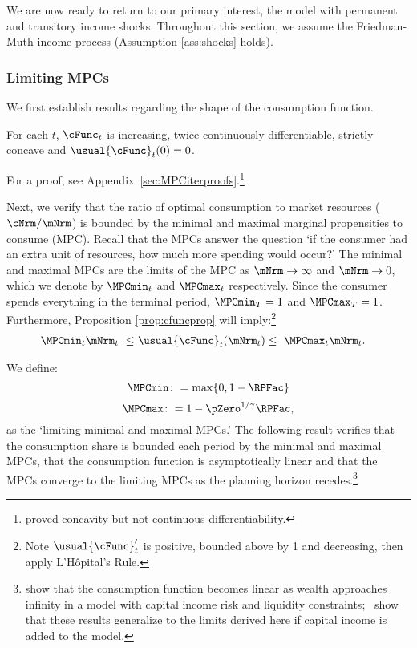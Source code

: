 \documentclass[BufferStockTheory]{subfiles}
\begin{document}
We are now ready to return to our primary interest, the model with permanent and transitory income shocks.
Throughout this section, we assume the Friedman-Muth income process (Assumption \ref{ass:shocks} holds).


\subsubsection{Limiting MPCs}\label{subsubsec:cFuncBounds}

We first establish results regarding the shape of the consumption function.


\begin{proposition} \label{prop:cfuncprop} For each $t$, $\cFunc_{t}$ is increasing, twice continuously differentiable, strictly concave and $\usual{\cFunc}_{t}(0)=0$.
\end{proposition}

For a proof, see Appendix~\ref{sec:MPCiterproofs}.\footnote{\cite{ckConcavity} proved concavity but not continuous differentiability.}

Next, we verify that the ratio of optimal consumption to market resources ($\cNrm/\mNrm$) is bounded by the minimal and maximal marginal propensities to consume (MPC).
Recall that the MPCs answer the question `if the consumer had an extra unit of resources, how much more spending would occur?' The minimal and maximal MPCs are the limits of the MPC as $\mNrm \rightarrow \infty$ and $\mNrm \rightarrow 0$, which we denote by $\MPCmin_{t}$ and $\MPCmax_{t}$ respectively.
Since the consumer spends everything in the terminal period, $\MPCmin_{T}=1$ and $\MPCmax_{T}=1$.
Furthermore, Proposition \ref{prop:cfuncprop} will imply:\footnote{Note $\usual{\cFunc}_{t}^{\prime}$ is positive, bounded above by 1 and decreasing, then apply L'H\^{o}pital's Rule.}
%
\begin{align}\label{eq:cBounds}
  \MPCmin_{t} \mNrm_{t} ~ \leq & ~  \usual{\cFunc}_{t}(\mNrm_{t})  \leq  ~ \MPCmax_{t} \mNrm_{t} .
\end{align} 


We define:
%
\hypertarget{MPCmaxDefn}{}\hypertarget{MPCminDefn}{}
\begin{equation}
\MPCmin \colon = \max\{0,1- \RPFac\} \label{eq:MPCminDefn}
\end{equation}
\begin{equation}
\MPCmax \colon = 1 - \pZero^{1/\gamma}\RPFac, \label{eq:MPCmaxDefn}
\end{equation}
as the `limiting minimal and maximal MPCs.'
The following result verifies that the consumption share is bounded each period by the minimal and maximal MPCs, that the consumption function is asymptotically linear and that the MPCs converge to the limiting MPCs as the planning horizon recedes.\footnote{\cite{benhabibWealth} show that the consumption function becomes linear as wealth approaches infinity in a model with capital income risk and liquidity constraints;~\cite{maTodaRich} show that these results generalize to the limits derived here if capital income is added to the model.} 
\hypertarget{cFuncBounds}{}
\end{document}
